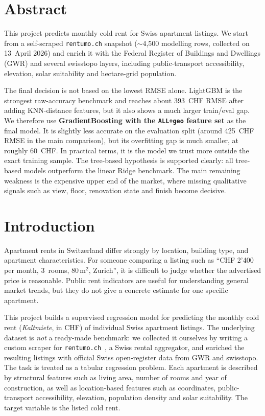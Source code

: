 \documentclass[11pt,a4paper]{article}
\begin{document}
\tableofcontents
\newpage

\section*{Abstract}
This project predicts monthly cold rent for Swiss apartment listings. We start from a self-scraped \texttt{rentumo.ch} snapshot ($\sim$4{,}500 modelling rows, collected on 13~April 2026) and enrich it with the Federal Register of Buildings and Dwellings (GWR) and several swisstopo layers, including public-transport accessibility, elevation, solar suitability and hectare-grid population.

The final decision is not based on the lowest RMSE alone. LightGBM is the strongest raw-accuracy benchmark and reaches about 393~CHF RMSE after adding KNN-distance features, but it also shows a much larger train/eval gap. We therefore use \textbf{GradientBoosting with the \texttt{ALL+geo} feature set} as the final model. It is slightly less accurate on the evaluation split (around 425~CHF RMSE in the main comparison), but its overfitting gap is much smaller, at roughly 60~CHF. In practical terms, it is the model we trust more outside the exact training sample. The tree-based hypothesis is supported clearly: all tree-based models outperform the linear Ridge benchmark. The main remaining weakness is the expensive upper end of the market, where missing qualitative signals such as view, floor, renovation state and finish become decisive.

\newpage

\section{Introduction}
\label{sec:introduction}

Apartment rents in Switzerland differ strongly by location, building type, and apartment characteristics. For someone comparing a listing such as ``CHF 2'400 per month, 3~rooms, 80\,m$^2$, Zurich'', it is difficult to judge whether the advertised price is reasonable. Public rent indicators are useful for understanding general market trends, but they do not give a concrete estimate for one specific apartment.

This project builds a supervised regression model for predicting the monthly cold rent (\emph{Kaltmiete}, in CHF) of individual Swiss apartment listings. The underlying dataset is \emph{not} a ready-made benchmark: we collected it ourselves by writing a custom scraper for \texttt{rentumo.ch}~\citep{rentumo}, a Swiss rental aggregator, and enriched the resulting listings with official Swiss open-register data from GWR and swisstopo. The task is treated as a tabular regression problem. Each apartment is described by structural features such as living area, number of rooms and year of construction, as well as location-based features such as coordinates, public-transport accessibility, elevation, population density and solar suitability. The target variable is the listed cold rent.
\end{document}

